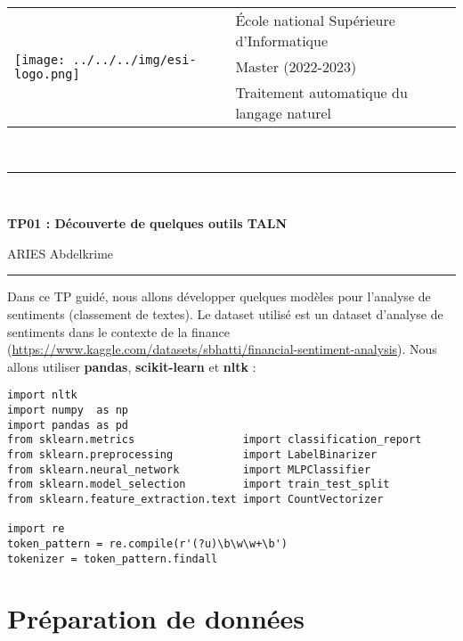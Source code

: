 \documentclass[11pt, a4paper]{article}
\begin{document}

\noindent
\begin{tabular}{ll}
\multirow{3}{*}{\texttt{[image: ../../../img/esi-logo.png]}} & \'Ecole national Supérieure d'Informatique\\
& Master (2022-2023) \\
& Traitement automatique du langage naturel
\end{tabular}\\[.25cm]
\noindent\rule{\textwidth}{1pt}\\%
\begin{center}
{\LARGE \textbf{TP01 : Découverte de quelques outils TALN}}
\begin{flushright}
	ARIES Abdelkrime
\end{flushright}
\end{center}
\noindent\rule{\textwidth}{1pt}

Dans ce TP guidé, nous allons développer quelques modèles pour l'analyse de sentiments (classement de textes).
Le dataset utilisé est un dataset d'analyse de sentiments dans le contexte de la finance (\url{https://www.kaggle.com/datasets/sbhatti/financial-sentiment-analysis}).
Nous allons utiliser \textbf{pandas}, \textbf{scikit-learn} et \textbf{nltk} :

\begin{verbatim}
import nltk
import numpy  as np
import pandas as pd
from sklearn.metrics                 import classification_report
from sklearn.preprocessing           import LabelBinarizer
from sklearn.neural_network          import MLPClassifier
from sklearn.model_selection         import train_test_split
from sklearn.feature_extraction.text import CountVectorizer

import re
token_pattern = re.compile(r'(?u)\b\w\w+\b')
tokenizer = token_pattern.findall
\end{verbatim}

\section{Préparation de données}
\end{document}
